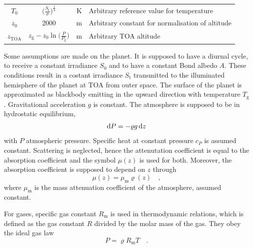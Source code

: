 \documentclass[a4paper,10pt,twocolumn,\classoptions]{article}
\newcommand{\zTOA}{z_\text{TOA}}
\begin{document}
\begin{table}[h]
\begin{tabular}[b]{cccp{}}
    $T_0$             & $\big( \frac{S_\text{t}}{\sigma} \big)^\frac{1}{4}$                    & \unit{\kelvin}                                    & Arbitrary reference value for temperature                                                 \\
    $z_0$             & \num{2000}                                                             & \unit{\metre}                                     & Arbitrary constant for normalisation of altitude                                          \\
    $\zTOA$           & $z_\text{g} - z_0 \ln{\Big( \frac{P}{P_\text{g}} \Big)}$               & \unit{\metre}                                     & Arbitrary TOA altitude                                                                    \\
    \bottomrule
  \end{tabular}
\end{table}

Some assumptions are made on the planet.
It is supposed to have a diurnal cycle, to receive a constant irradiance $S_0$ and to have a constant Bond albedo $A$. These conditions result in a costant irradiance $S_\text{t}$ transmitted to the illuminated hemisphere of the planet at TOA from outer space.
The surface of the planet is approximated as blackbody emitting in the upward direction with temperature $T_\text{g}$.
Gravitational acceleration $g$ is constant.
The atmosphere is supposed to be in hydrostatic equilibrium,
\begin{equation}
  \label{eq:hydrostatic_equilibrium}
  \odif{P} = - \varrho g \odif{z}
\end{equation}
with $P$ atmospheric pressure.
Specific heat at constant pressure $c_P$ is assumed constant.
Scattering is neglected, hence the attenutation coefficient is equal to the absorption coefficient and the symbol $\mu(z)$ is used for both.
Moreover, the absorption coefficient is supposed to depend on $z$ through
\begin{equation}
  \label{eq:absorption coefficient}
  \mu(z) = \mu_\text{m} \varrho(z)
  \quad ,
\end{equation}
where $\mu_\text{m}$ is the mass attenuation coefficient of the atmosphere, assumed constant.

For gases, specific gas constant $R_\text{m}$ is used in thermodynamic relations, which is defined as the gas constant $R$ divided by the molar mass of the gas.
They obey the ideal gas law
\begin{equation}
  \label{eq:ideal_gas_law}
  P = \varrho R_\text{m} T
  \quad .
\end{equation}
\end{document}
